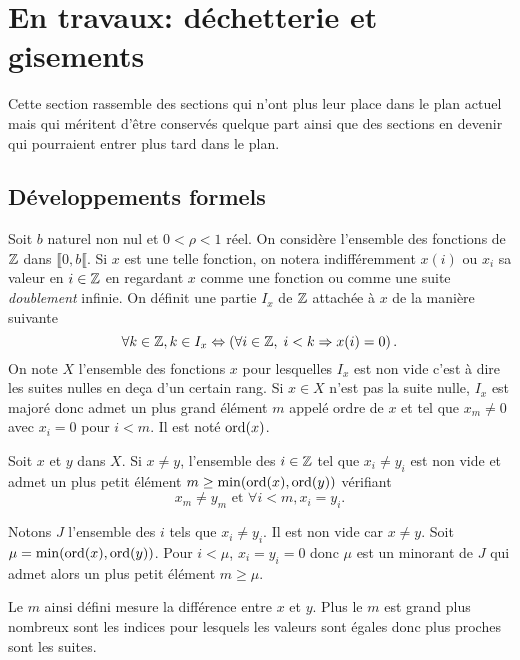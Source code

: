 \chapter{En travaux: déchetterie et gisements}
Cette section rassemble des sections qui n'ont plus leur place dans le plan actuel mais qui méritent d'être conservés quelque part ainsi que des sections en devenir qui pourraient entrer plus tard dans le plan.
\section{Développements formels}
Soit $b$ naturel non nul et $0 < \rho < 1$ réel.\newline
On considère l'ensemble des fonctions de $\mathbb{Z}$ dans $\llbracket 0, b\llbracket$. Si $x$ est une telle fonction, on notera indifféremment $x(i)$ ou $x_i$ sa valeur en $i\in \mathbb{Z}$ en regardant $x$ comme une fonction ou comme une suite \emph{doublement} infinie. On définit une partie $I_x$ de $\mathbb{Z}$ attachée à $x$ de la manière suivante
\begin{displaymath}
 \forall k \in \mathbb{Z}, k \in I_x \Leftrightarrow \left( \forall i \in\mathbb{Z}, \;i < k \Rightarrow x(i) = 0 \right).
\end{displaymath}
On note $X$ l'ensemble des fonctions $x$ pour lesquelles $I_x$ est non vide c'est à dire les suites nulles en deça d'un certain rang.\newline
Si $x\in X$ n'est pas la suite nulle, $I_x$ est majoré donc admet un plus grand élément $m$ appelé ordre de $x$ et tel que $x_m \neq 0$ avec $x_i=0$ pour $i<m$. Il est noté $\mathop{\mathrm{ord}}(x)$.
\begin{prop}
 Soit $x$ et $y$ dans $X$. Si $x\neq y$, l'ensemble des $i\in \mathbb{Z}$ tel que $x_i \neq y_i$ est non vide et admet un plus petit élément $m \geq \min(\mathop{\mathrm{ord}}(x),\mathop{\mathrm{ord}}(y))$ vérifiant
 \begin{displaymath}
  x_m \neq y_m \text{ et } \forall i< m, x_i = y_i.
 \end{displaymath}
\end{prop}
\begin{demo}
 Notons $J$ l'ensemble des $i$ tels que $x_i \neq y_i$. Il est non vide car $x \neq y$. Soit $\mu = \min(\mathop{\mathrm{ord}}(x),\mathop{\mathrm{ord}}(y))$. Pour $i< \mu $, $x_i = y_i =0$ donc $\mu$ est un minorant de $J$ qui admet alors un plus petit élément $m \geq \mu$.
\end{demo}
\begin{rem}
 Le $m$ ainsi défini mesure la différence entre $x$ et $y$. Plus le $m$ est grand plus nombreux sont les indices pour lesquels les valeurs sont égales donc plus proches sont les suites.
\end{rem}
